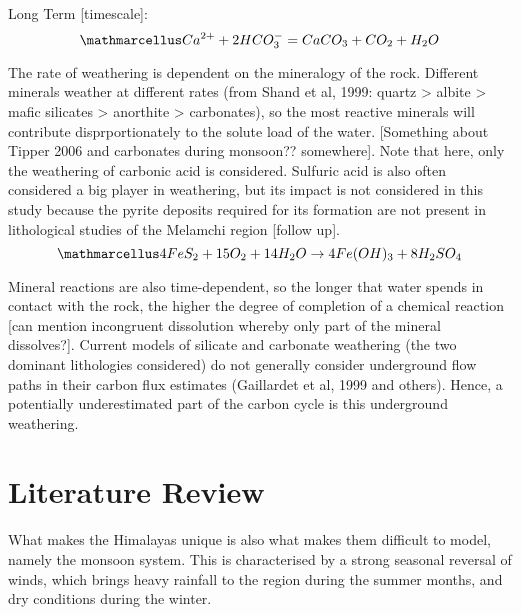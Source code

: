 \begin{tcolorbox}
{\begin{center}
    Long Term [timescale]:
    \[
    \ttmath{Ca^{2+} + 2HCO_3^- = CaCO_3 + CO_2 + H_2O}
    \]
    
    \end{center}

The rate of weathering is dependent on the mineralogy of the rock. Different minerals weather at different rates (from Shand et al, 1999: quartz > albite > mafic silicates > anorthite > carbonates), so the most reactive minerals will contribute disprportionately to the solute load of the water. [Something about Tipper 2006 and carbonates during monsoon?? somewhere]. Note that here, only the weathering of carbonic acid is considered. Sulfuric acid is also often considered a big player in weathering, but its impact is not considered in this study because the pyrite deposits required for its formation are not present in lithological studies of the Melamchi region [follow up].
\[
\ttmath{4FeS_2 + 15O_2 + 14H_2O \rightarrow 4Fe(OH)_3 + 8H_2SO_4}
\] 

Mineral reactions are also time-dependent, so the longer that water spends in contact with the rock, the higher the degree of completion of a chemical reaction [can mention incongruent dissolution whereby only part of the mineral dissolves?]. Current models of silicate and carbonate weathering (the two dominant lithologies considered) do not generally consider underground flow paths in their carbon flux estimates (Gaillardet et al, 1999 and others). Hence, a potentially underestimated part of the carbon cycle is this underground weathering.

}
\end{tcolorbox}


\newpage

\section{Literature Review}

What makes the Himalayas unique is also what makes them difficult to model, namely the monsoon system. This is characterised by a strong seasonal reversal of winds, which brings heavy rainfall to the region during the summer months, and dry conditions during the winter.


